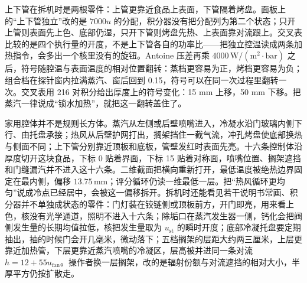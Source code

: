 上下管在拆机时是两根零件：上管更靠近食品上表面，下管隔着烤盘。面板上的“上下管独立”改的是 \(7000u\) 的分配，积分器没有把分配列为第二个状态；只开上管则表面先上色、底部仍湿，只开下管则烤盘先热、上表面靠对流跟上。交叉表比较的是四个执行量的开度，不是上下管各自的功率比——把独立控温读成两条加热指令，会多出一个核里没有的旋钮。Antoine 压差再乘 \(4000\,\mathrm{W}/(\mathrm{m}^2\cdot\mathrm{bar})\) 之后，符号随腔温与表面温度的相对位置翻转：蒸档更容易为正，烤档更容易为负；组合档在探针窗内拉满蒸汽、窗后回到 0.15，符号可以在同一次过程里翻转一次。交叉表用 216 对积分给出厚度上的符号变化：15 mm 上移，50 mm 下移。把蒸汽一律说成“锁水加热”，就把这一翻转盖住了。

家用腔体并不是规则长方体。蒸汽从左侧或后壁喷嘴进入，冷凝水沿门玻璃内侧下行、由托盘承接；热风从后壁护网打出，搁架挡住一截气流，冲孔烤盘使底部换热与侧面不同；上下管分别靠近顶板和底板，管壁发红时表面先亮。十六条控制体沿厚度切开这块食品，下标 0 贴着界面，下标 15 贴着对称面，喷嘴位置、搁架遮挡和门缝漏汽并不进入这十六条。二维截面把横向重新打开，最低温度被绝热边界固定在最内侧，偏移 \(13.75\,\mathrm{mm}\)；评分循环仍读一维最低一层。把“热风循环更均匀”说成冷点已经居中，会被这一偏移拆开。拆机时还能看见若干说明书常画、积分器并不单独成状态的零件：门灯装在铰链侧或顶板前方，开门即亮，用来看上色，核没有光学通道，照明不进入十六条；除垢口在蒸汽发生器一侧，钙化会把阀侧发生量的长期均值拉低，核把发生量取为 \(u_{\mathrm{st}}\) 的瞬时开度；底部冷凝托盘要定期抽出，抽的时候门会开几毫米，微动落下；五档搁架的层距大约两三厘米，上层更靠近加热管，下层更靠近蒸汽喷嘴的冷凝区，层高被并进同一条对流 \(h=12+55u_{\mathrm{fan}}\)。操作者换一层搁架，改的是辐射份额与对流遮挡的相对大小，半厚平方仍按扩散走。
